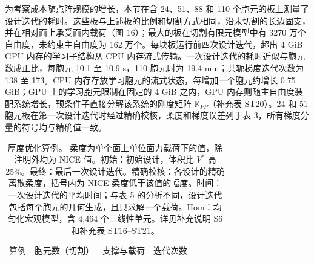 \documentclass[preprint,12pt,authoryear]{elsarticle}
\begin{document}
为考察成本随点阵规模的增长，本节在含 24、51、88 和 110 个胞元的板上测量了设计迭代的耗时。这些板与上述板的比例和切割方式相同，沿未切割的长边固支，并在相对面上承受面内载荷（图 16）；最大的板在切割有限元模型中有 3270 万个自由度，未约束主自由度为 162 万个。每块板运行前四次设计迭代，超出 4 GiB GPU 内存的学习子结构从 CPU 内存流式传输。一次设计迭代的耗时近似与胞元数成正比，每胞元 10.1 至 10.9 s，110 胞元时为 19.4 min；共轭梯度迭代次数为 138 至 173。CPU 内存存放学习胞元的流式状态，每增加一个胞元约增长 0.75 GiB；GPU 上的学习胞元限制在固定的 4 GiB 之内，GPU 内存则随主自由度装配系统增长，预条件子直接分解该系统的刚度矩阵 \(\mathbb K_{PP}\)（补充表 ST20）。24 和 51 胞元板在第一次设计迭代时经过精确校核，柔度和梯度误差列于表 3，所有梯度分量的符号均与精确值一致。

{\scriptsize
\begin{longtable}[]{@{}
  >{\raggedright\arraybackslash}p{}
  >{\raggedright\arraybackslash}p{}
  >{\raggedright\arraybackslash}p{}
  >{\raggedleft\arraybackslash}p{}
  >{\raggedleft\arraybackslash}p{}
  >{\raggedleft\arraybackslash}p{}
  >{\raggedright\arraybackslash}p{}
  >{\raggedleft\arraybackslash}p{}@{}}
\caption{厚度优化算例。 柔度为单个面上单位面力载荷下的值，除注明外均为 NICE 值。初始：初始设计，体积比 \(V^*\) 高 25\%。最终：最后一次设计迭代。精确校核：各设计的精确离散柔度，括号内为 NICE 柔度低于该值的幅度。时间：一次设计迭代的平均时间；与表 5 的分析不同，设计迭代包括每个胞元的几何生成，且只求解一个载荷。Hom：均匀化宏观模型，含 4,464 个三线性单元。详见补充说明 S6 和补充表 ST16--ST21。}\tabularnewline
\toprule\noalign{}
\begin{minipage}[b]{\linewidth}\raggedright
算例
\end{minipage} & \begin{minipage}[b]{\linewidth}\raggedright
胞元数（切割）
\end{minipage} & \begin{minipage}[b]{\linewidth}\raggedright
支撑与载荷
\end{minipage} & \begin{minipage}[b]{\linewidth}\raggedleft
迭代次数
\end{minipage} & \begin{minipage}[b]{\linewidth}\raggedleft

\end{minipage}
\end{longtable}}
\end{document}
